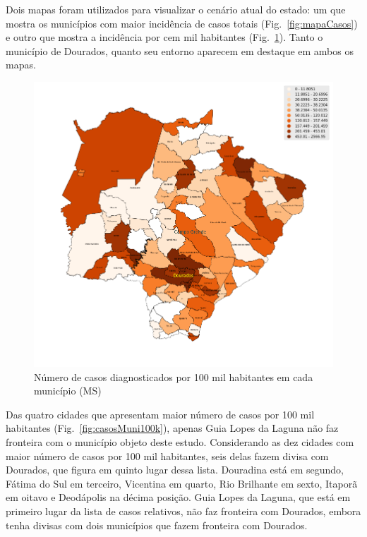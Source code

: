 \documentclass[12pt]{article}
\begin{document}
Dois mapas foram utilizados para visualizar o cenário atual do estado: um que mostra os municípios com maior incidência de casos totais (Fig.~\ref{fig:mapaCasos}) e outro que mostra a incidência por cem mil habitantes (Fig.~\ref{fig:mapa100K}). Tanto o município de Dourados, quanto seu entorno aparecem em destaque em ambos os mapas.

\begin{figure}[!htb]
    \centering
    \includegraphics[width=1\textwidth]{figs/mapa_casos_100_mil.png}
    \caption{Número de casos diagnosticados por 100 mil habitantes em cada município (MS)}
    \label{fig:mapa100K}
    \end{figure}
  
Das quatro cidades que apresentam maior número de casos por 100 mil habitantes (Fig.~\ref{fig:casosMuni100k}), apenas Guia Lopes da Laguna não faz fronteira com o município objeto deste estudo. Considerando as dez cidades com maior número de casos por 100 mil habitantes, seis delas fazem divisa com Dourados, que figura em quinto lugar dessa lista. Douradina está em segundo, Fátima do Sul em terceiro, Vicentina em quarto, Rio Brilhante em sexto, Itaporã em oitavo e Deodápolis na décima posição. Guia Lopes da Laguna, que está em primeiro lugar da lista de casos relativos, não faz fronteira com Dourados, embora tenha divisas com dois municípios que fazem fronteira com Dourados.
\end{document}
